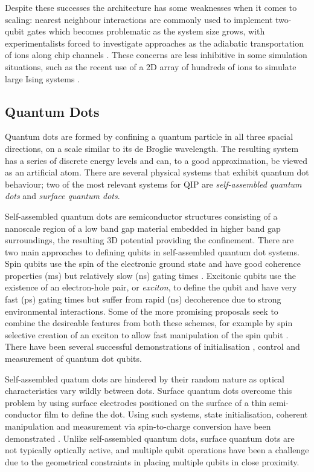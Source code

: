 Despite these successes the architecture has some weaknesses when it comes to scaling: nearest neighbour interactions are commonly used to implement two-qubit gates which becomes problematic as the system size grows, with experimentalists forced to investigate approaches as the adiabatic transportation of ions along chip channels \cite{ion_trap_on_chip}. These concerns are less inhibitive in some simulation situations, such as the recent use of a 2D array of hundreds of ions to simulate large Ising systems \cite{ion_trap_magnetism_simulator}.

\subsection{Quantum Dots}

Quantum dots are formed by confining a quantum particle in all three spacial directions, on a scale similar to its de Broglie wavelength. The resulting system has a series of discrete energy levels and can, to a good approximation, be viewed as an artificial atom. There are several physical systems that exhibit quantum dot behaviour; two of the most relevant systems for QIP are \textit{self-assembled quantum dots} and \textit{surface quantum dots}.

Self-assembled quantum dots are semiconductor structures consisting of a nanoscale region of a low band gap material embedded in higher band gap surroundings, the resulting 3D potential providing the confinement.  There are two main approaches to defining qubits in self-assembled quantum dot systems. Spin qubits use the spin of the electronic ground state and have good coherence properties (ms) \cite{Kroutvar:2004p4951, Greilich:2006p5031} but relatively slow (ns) gating times \cite{Burkard:1999p5057}. Excitonic qubits use the existence of an electron-hole pair, or \textit{exciton}, to define the qubit and have very fast (ps) gating times \cite{Li:2003p5178} but suffer from rapid (ns) decoherence due to strong environmental interactions. Some of the more promising proposals seek to combine the desireable features from both these schemes, for example by spin selective creation of an exciton to allow fast manipulation of the spin qubit \cite{Calarco:2003p5363, Chen:2000p5290, Yokoi:2005p5390}. There have been several successful demonstrations of initialisation \cite{atature_quantum_dot_06, gerardot_dot_08}, control \cite{quantum_dot_control_08} and measurement \cite{quantum_dot_measurement_06} of quantum dot qubits.

Self-assembled quatum dots are hindered by their random nature as optical characteristics vary wildly between dots. Surface quantum dots overcome this problem by using surface electrodes positioned on the surface of a thin semi-conductor film to define the dot. Using such systems, state initialisation, coherent manipulation and measurement via spin-to-charge conversion have been demonstrated \cite{quantum_dot_nanowires_example}. Unlike self-assembled quantum dots, surface quantum dots are not typically optically active, and multiple qubit operations have been a challenge due to the geometrical constraints in placing multiple qubits in close proximity.

